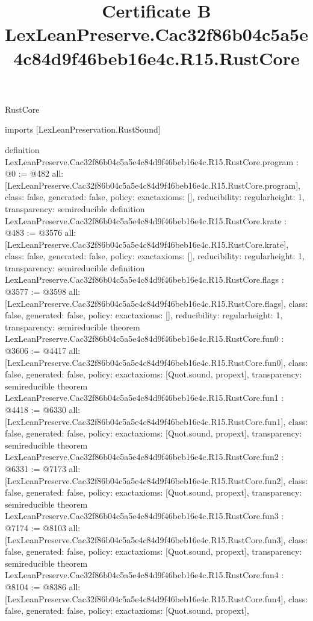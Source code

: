 \begin{lexlean}{RustCore}
\title{Certificate B LexLeanPreserve.Cac32f86b04c5a5e4c84d9f46beb16e4c.R15.RustCore}
\begin{coremodule}
imports [LexLeanPreservation.RustSound]

definition LexLeanPreserve.Cac32f86b04c5a5e4c84d9f46beb16e4c.R15.RustCore.program : @0 := @482 {
  all: [LexLeanPreserve.Cac32f86b04c5a5e4c84d9f46beb16e4c.R15.RustCore.program],
  class: false,
  generated: false,
  policy: exact{axioms: []},
  reducibility: regular{height: 1},
  transparency: semireducible
}
definition LexLeanPreserve.Cac32f86b04c5a5e4c84d9f46beb16e4c.R15.RustCore.krate : @483 := @3576 {
  all: [LexLeanPreserve.Cac32f86b04c5a5e4c84d9f46beb16e4c.R15.RustCore.krate],
  class: false,
  generated: false,
  policy: exact{axioms: []},
  reducibility: regular{height: 1},
  transparency: semireducible
}
definition LexLeanPreserve.Cac32f86b04c5a5e4c84d9f46beb16e4c.R15.RustCore.flags : @3577 := @3598 {
  all: [LexLeanPreserve.Cac32f86b04c5a5e4c84d9f46beb16e4c.R15.RustCore.flags],
  class: false,
  generated: false,
  policy: exact{axioms: []},
  reducibility: regular{height: 1},
  transparency: semireducible
}
theorem LexLeanPreserve.Cac32f86b04c5a5e4c84d9f46beb16e4c.R15.RustCore.fun0 : @3606 := @4417 {
  all: [LexLeanPreserve.Cac32f86b04c5a5e4c84d9f46beb16e4c.R15.RustCore.fun0],
  class: false,
  generated: false,
  policy: exact{axioms: [Quot.sound, propext]},
  transparency: semireducible
}
theorem LexLeanPreserve.Cac32f86b04c5a5e4c84d9f46beb16e4c.R15.RustCore.fun1 : @4418 := @6330 {
  all: [LexLeanPreserve.Cac32f86b04c5a5e4c84d9f46beb16e4c.R15.RustCore.fun1],
  class: false,
  generated: false,
  policy: exact{axioms: [Quot.sound, propext]},
  transparency: semireducible
}
theorem LexLeanPreserve.Cac32f86b04c5a5e4c84d9f46beb16e4c.R15.RustCore.fun2 : @6331 := @7173 {
  all: [LexLeanPreserve.Cac32f86b04c5a5e4c84d9f46beb16e4c.R15.RustCore.fun2],
  class: false,
  generated: false,
  policy: exact{axioms: [Quot.sound, propext]},
  transparency: semireducible
}
theorem LexLeanPreserve.Cac32f86b04c5a5e4c84d9f46beb16e4c.R15.RustCore.fun3 : @7174 := @8103 {
  all: [LexLeanPreserve.Cac32f86b04c5a5e4c84d9f46beb16e4c.R15.RustCore.fun3],
  class: false,
  generated: false,
  policy: exact{axioms: [Quot.sound, propext]},
  transparency: semireducible
}
theorem LexLeanPreserve.Cac32f86b04c5a5e4c84d9f46beb16e4c.R15.RustCore.fun4 : @8104 := @8386 {
  all: [LexLeanPreserve.Cac32f86b04c5a5e4c84d9f46beb16e4c.R15.RustCore.fun4],
  class: false,
  generated: false,
  policy: exact{axioms: [Quot.sound, propext]},
}
\end{coremodule}
\end{lexlean}
